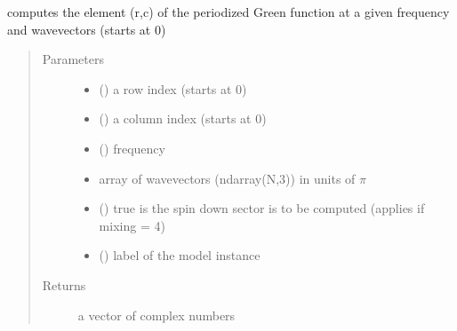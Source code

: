 \documentclass[letterpaper,10pt,english]{sphinxmanual}
\begin{document}

\begin{fulllineitems}
\label{\detokenize{functions:pyqcm.periodized_Green_function_element}}
\sphinxAtStartPar
computes the element (r,c) of the periodized Green function at a given frequency and wavevectors (starts at 0)
\begin{quote}\begin{description}
\item[{Parameters}] \leavevmode\begin{itemize}
\item {} 
\sphinxAtStartPar
{} () \textendash{} a row index (starts at 0)

\item {} 
\sphinxAtStartPar
{} () \textendash{} a column index (starts at 0)

\item {} 
\sphinxAtStartPar
{} () \textendash{} frequency

\item {} 
\sphinxAtStartPar
{} \textendash{} array of wavevectors (ndarray(N,3)) in units of \(\pi\)

\item {} 
\sphinxAtStartPar
{} () \textendash{} true is the spin down sector is to be computed (applies if mixing = 4)

\item {} 
\sphinxAtStartPar
{} () \textendash{} label of the model instance

\end{itemize}

\item[{Returns}] \leavevmode
\sphinxAtStartPar
a vector of complex numbers

\end{description}\end{quote}

\end{fulllineitems}
\end{document}
